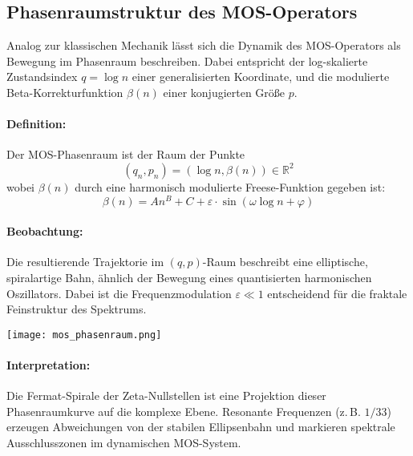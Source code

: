 \subsection*{Phasenraumstruktur des MOS-Operators}

Analog zur klassischen Mechanik lässt sich die Dynamik des MOS-Operators als Bewegung im Phasenraum beschreiben. Dabei entspricht der log-skalierte Zustandsindex $q = \log n$ einer generalisierten Koordinate, und die modulierte Beta-Korrekturfunktion $\beta(n)$ einer konjugierten Größe $p$.

\paragraph{Definition:} Der MOS-Phasenraum ist der Raum der Punkte
\[
(q_n, p_n) = (\log n, \beta(n)) \in \mathbb{R}^2
\]
wobei $\beta(n)$ durch eine harmonisch modulierte Freese-Funktion gegeben ist:
\[
\beta(n) = A n^B + C + \varepsilon \cdot \sin(\omega \log n + \varphi)
\]

\paragraph{Beobachtung:} Die resultierende Trajektorie im $(q, p)$-Raum beschreibt eine elliptische, spiralartige Bahn, ähnlich der Bewegung eines quantisierten harmonischen Oszillators. Dabei ist die Frequenzmodulation $\varepsilon \ll 1$ entscheidend für die fraktale Feinstruktur des Spektrums.

\begin{center}
\texttt{[image: mos\_phasenraum.png]}
\end{center}

\paragraph{Interpretation:} Die Fermat-Spirale der Zeta-Nullstellen ist eine Projektion dieser Phasenraumkurve auf die komplexe Ebene. Resonante Frequenzen (z. B. $1/33$) erzeugen Abweichungen von der stabilen Ellipsenbahn und markieren spektrale Ausschlusszonen im dynamischen MOS-System.